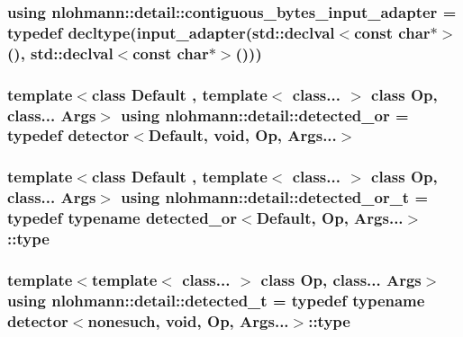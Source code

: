 \subsubsection[{\texorpdfstring{contiguous\+\_\+bytes\+\_\+input\+\_\+adapter}{contiguous_bytes_input_adapter}}]{\setlength{\rightskip}{0pt plus 5cm}using {\bf nlohmann\+::detail\+::contiguous\+\_\+bytes\+\_\+input\+\_\+adapter} = typedef decltype({\bf input\+\_\+adapter}(std\+::declval$<$const char$\ast$$>$(), std\+::declval$<$const char$\ast$$>$()))}\hypertarget{namespacenlohmann_1_1detail_abc51edd46a1d1a0ff06a19f08ceff563}{}\label{namespacenlohmann_1_1detail_abc51edd46a1d1a0ff06a19f08ceff563}
\subsubsection[{\texorpdfstring{detected\+\_\+or}{detected_or}}]{\setlength{\rightskip}{0pt plus 5cm}template$<$class Default , template$<$ class... $>$ class Op, class... Args$>$ using {\bf nlohmann\+::detail\+::detected\+\_\+or} = typedef {\bf detector}$<$Default, {\bf void}, Op, Args...$>$}\hypertarget{namespacenlohmann_1_1detail_a240ce21919ab08e8a6cb3a5cfa412bce}{}\label{namespacenlohmann_1_1detail_a240ce21919ab08e8a6cb3a5cfa412bce}
\subsubsection[{\texorpdfstring{detected\+\_\+or\+\_\+t}{detected_or_t}}]{\setlength{\rightskip}{0pt plus 5cm}template$<$class Default , template$<$ class... $>$ class Op, class... Args$>$ using {\bf nlohmann\+::detail\+::detected\+\_\+or\+\_\+t} = typedef typename {\bf detected\+\_\+or}$<$Default, Op, Args...$>$\+::type}\hypertarget{namespacenlohmann_1_1detail_a7ac5b8ef0363101275a2827b3b117dcf}{}\label{namespacenlohmann_1_1detail_a7ac5b8ef0363101275a2827b3b117dcf}
\subsubsection[{\texorpdfstring{detected\+\_\+t}{detected_t}}]{\setlength{\rightskip}{0pt plus 5cm}template$<$template$<$ class... $>$ class Op, class... Args$>$ using {\bf nlohmann\+::detail\+::detected\+\_\+t} = typedef typename {\bf detector}$<${\bf nonesuch}, {\bf void}, Op, Args...$>$\+::type}\hypertarget{namespacenlohmann_1_1detail_a37e97a32d0b94ce5f745427e4e40204d}{}\label{namespacenlohmann_1_1detail_a37e97a32d0b94ce5f745427e4e40204d}
